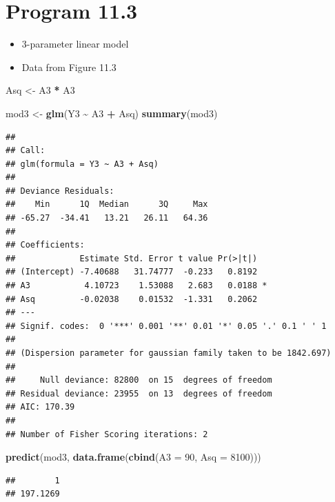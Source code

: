 \documentclass[
  10pt,
]{book}
\newenvironment{Shaded}{\begin{snugshade}}{\end{snugshade}}
\newcommand{\DataTypeTok}[1]{\textcolor[rgb]{0.13,0.29,0.53}{#1}}
\newcommand{\DecValTok}[1]{\textcolor[rgb]{0.00,0.00,0.81}{#1}}
\newcommand{\KeywordTok}[1]{\textcolor[rgb]{0.13,0.29,0.53}{\textbf{#1}}}
\newcommand{\NormalTok}[1]{#1}
\newcommand{\OperatorTok}[1]{\textcolor[rgb]{0.81,0.36,0.00}{\textbf{#1}}}
\newcommand{\StringTok}[1]{\textcolor[rgb]{0.31,0.60,0.02}{#1}}
\providecommand{\tightlist}{%
  \setlength{\itemsep}{0pt}\setlength{\parskip}{0pt}}
\begin{document}
\hypertarget{program-11.3}{%
\section{Program 11.3}\label{program-11.3}}

\begin{itemize}
\tightlist
\item
  3-parameter linear model
\item
  Data from Figure 11.3
\end{itemize}

\begin{Shaded}
\begin{Highlighting}[]
\NormalTok{Asq \textless{}{-}}\StringTok{ }\NormalTok{A3 }\OperatorTok{*}\StringTok{ }\NormalTok{A3}

\NormalTok{mod3 \textless{}{-}}\StringTok{ }\KeywordTok{glm}\NormalTok{(Y3 }\OperatorTok{\textasciitilde{}}\StringTok{ }\NormalTok{A3 }\OperatorTok{+}\StringTok{ }\NormalTok{Asq)}
\KeywordTok{summary}\NormalTok{(mod3)}
\end{Highlighting}
\end{Shaded}

\begin{verbatim}
## 
## Call:
## glm(formula = Y3 ~ A3 + Asq)
## 
## Deviance Residuals: 
##    Min      1Q  Median      3Q     Max  
## -65.27  -34.41   13.21   26.11   64.36  
## 
## Coefficients:
##             Estimate Std. Error t value Pr(>|t|)  
## (Intercept) -7.40688   31.74777  -0.233   0.8192  
## A3           4.10723    1.53088   2.683   0.0188 *
## Asq         -0.02038    0.01532  -1.331   0.2062  
## ---
## Signif. codes:  0 '***' 0.001 '**' 0.01 '*' 0.05 '.' 0.1 ' ' 1
## 
## (Dispersion parameter for gaussian family taken to be 1842.697)
## 
##     Null deviance: 82800  on 15  degrees of freedom
## Residual deviance: 23955  on 13  degrees of freedom
## AIC: 170.39
## 
## Number of Fisher Scoring iterations: 2
\end{verbatim}

\begin{Shaded}
\begin{Highlighting}[]
\KeywordTok{predict}\NormalTok{(mod3, }\KeywordTok{data.frame}\NormalTok{(}\KeywordTok{cbind}\NormalTok{(}\DataTypeTok{A3 =} \DecValTok{90}\NormalTok{, }\DataTypeTok{Asq =} \DecValTok{8100}\NormalTok{)))}
\end{Highlighting}
\end{Shaded}

\begin{verbatim}
##        1 
## 197.1269
\end{verbatim}
\end{document}
